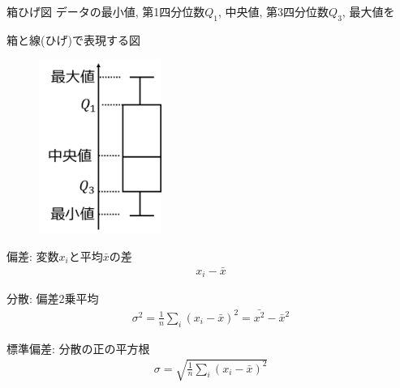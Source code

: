 \documentclass[aspectratio=169, 12pt]{beamer} %
\begin{document}
\begin{frame}{箱ひげ図}
    データの最小値, 第1四分位数$Q_1$, 中央値, 第3四分位数$Q_3$, 最大値を\par
    箱と線(ひげ)で表現する図 \par
    \begin{figure}[htbp]
        \begin{center}
            \includegraphics[width=40mm]{fig/6.png}
        \end{center}
    \end{figure}
\end{frame}
\begin{frame}{偏差: 変数$x_i$と平均$\bar{x}$の差}
    \begin{eqnarray*}
        x_i-\bar{x}
    \end{eqnarray*}
\end{frame}
\begin{frame}{分散: 偏差2乗平均}
    \begin{eqnarray*}
        \sigma^2=\frac{1}{n}\sum_i (x_i-\bar{x})^2=\bar{x^2}-\bar{x}^2
    \end{eqnarray*}
\end{frame}
\begin{frame}{標準偏差: 分散の正の平方根}
    \begin{eqnarray*}
        \sigma=\sqrt{\frac{1}{n}\sum_i (x_i-\bar{x})^2}
    \end{eqnarray*}
\end{frame}
\end{document}
